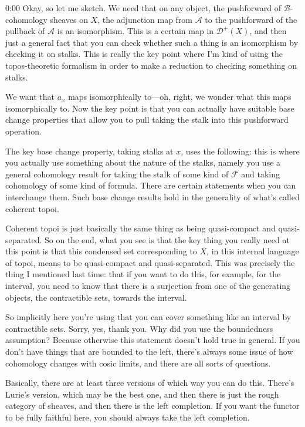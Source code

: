\begin{unfinished}{0:00}
Okay, so let me sketch. We need that on any object, the pushforward of $\mathcal{B}$-cohomology sheaves on $X$, the adjunction map from $\mathcal{A}$ to the pushforward of the pullback of $\mathcal{A}$ is an isomorphism. This is a certain map in $\mathcal{D}^+(X)$, and then just a general fact that you can check whether such a thing is an isomorphism by checking it on stalks. This is really the key point where I'm kind of using the topos-theoretic formalism in order to make a reduction to checking something on stalks.

We want that $a_x$ maps isomorphically to---oh, right, we wonder what this maps isomorphically to. Now the key point is that you can actually have suitable base change properties that allow you to pull taking the stalk into this pushforward operation.

The key base change property, taking stalks at $x$, uses the following: this is where you actually use something about the nature of the stalks, namely you use a general cohomology result for taking the stalk of some kind of $\mathcal{F}$ and taking cohomology of some kind of formula. There are certain statements when you can interchange them. Such base change results hold in the generality of what's called coherent topoi.

Coherent topoi is just basically the same thing as being quasi-compact and quasi-separated. So on the end, what you see is that the key thing you really need at this point is that this condensed set corresponding to $X$, in this internal language of topoi, means to be quasi-compact and quasi-separated. This was precisely the thing I mentioned last time: that if you want to do this, for example, for the interval, you need to know that there is a surjection from one of the generating objects, the contractible sets, towards the interval.

So implicitly here you're using that you can cover something like an interval by contractible sets. Sorry, yes, thank you. Why did you use the boundedness assumption? Because otherwise this statement doesn't hold true in general. If you don't have things that are bounded to the left, there's always some issue of how cohomology changes with cosic limits, and there are all sorts of questions.

Basically, there are at least three versions of which way you can do this. There's Lurie's version, which may be the best one, and then there is just the rough category of sheaves, and then there is the left completion. If you want the functor to be fully faithful here, you should always take the left completion.


\end{unfinished}
